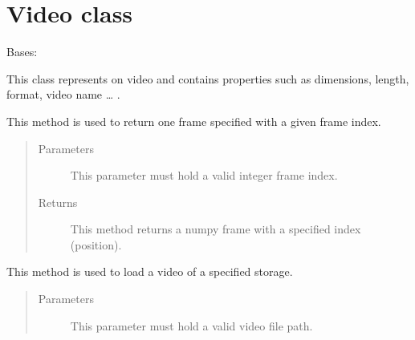 \documentclass[letterpaper,10pt,english,openany,oneside]{sphinxmanual}
\begin{document}
\section{Video class}
\label{\detokenize{Video:video-class}}\label{\detokenize{Video::doc}}

\begin{fulllineitems}
\label{\detokenize{Video:sbd.Video.Video}}
Bases: 

This class represents on video and contains properties such as dimensions, length, format, video name … .

\begin{fulllineitems}
\label{\detokenize{Video:sbd.Video.Video.getFrame}}
This method is used to return one frame specified with a given frame index.
\begin{quote}\begin{description}
\item[{Parameters}] \leavevmode
{} \textendash{} This parameter must hold a valid integer frame index.

\item[{Returns}] \leavevmode
This method returns a numpy frame with a specified index (position).

\end{description}\end{quote}

\end{fulllineitems}


\begin{fulllineitems}
\label{\detokenize{Video:sbd.Video.Video.load}}
This method is used to load a video of a specified storage.
\begin{quote}\begin{description}
\item[{Parameters}] \leavevmode
{} \textendash{} This parameter must hold a valid video file path.


\end{description}
\end{quote}
\end{fulllineitems}
\end{fulllineitems}
\end{document}
